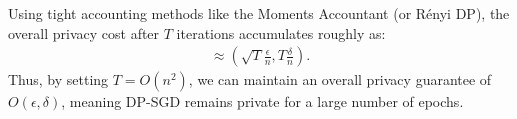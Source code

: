 \documentclass[11pt, a4paper]{article}
\newtheorem{theorem}{Theorem}
\begin{document}
% 
% 
% 
Using tight accounting methods like the Moments Accountant (or R\'enyi DP), the overall privacy cost after $T$ iterations accumulates roughly as:
\begin{align}
    \approx \left(\sqrt{T}\frac{\epsilon}{n}, T\frac{\delta}{n}\right).
\end{align}
Thus, by setting $T = O(n^2)$, we can maintain an overall privacy guarantee of $O(\epsilon, \delta)$, meaning DP-SGD remains private for a large number of epochs.
\end{document}
